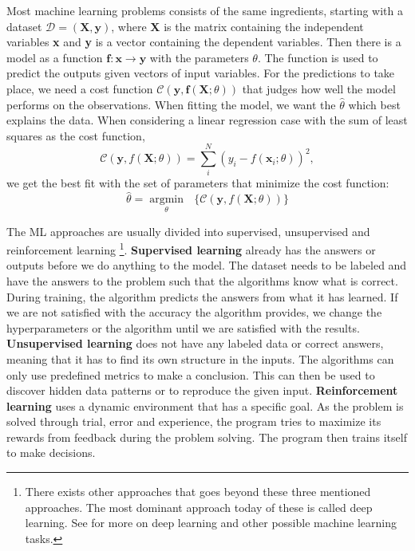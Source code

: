 \documentclass[a4paper, american, 12pt]{report}
\DeclareMathOperator*{\argmin}{argmin}
\begin{document}
	Most machine learning problems consists of the same ingredients, starting with a dataset $\mathcal{D}=(\textbf{X}, \textbf{y})$, where \textbf{X} is the matrix containing the independent variables \textbf{x} and \textbf{y} is a vector containing the dependent variables. Then there is a model as a function $\textbf{f}:\textbf{x}\rightarrow\textbf{y}$ with the parameters $\theta$. The function is used to predict the outputs given vectors of input variables. For the predictions to take place, we need a cost function $\mathcal{C}(\textbf{y},\textbf{f}(\textbf{X};\theta))$ that judges how well the model performs on the observations. When fitting the model, we want the $\hat{\theta}$ which best explains the data. When considering a linear regression case with the sum of least squares as the cost function,
	\begin{equation}
	\label{eq:SumLeastSquares}
		\mathcal{C}(\textbf{y},f(\textbf{X};\theta))=\sum_{i}^{N}(y_i-f(\textbf{x}_i;\theta))^2,
	\end{equation}
	we get the best fit with the set of parameters that minimize the cost function:
	\begin{equation}
	\label{eq:MinCostFunc}
		\hat{\theta}=\underset{\theta}{\argmin}\text{ } \{\mathcal{C}(\textbf{y},f(\textbf{X};\theta))\}
	\end{equation}
	
	The ML approaches are usually divided into supervised, unsupervised and reinforcement learning \footnote{There exists other approaches that goes beyond these three mentioned approaches. The most dominant approach today of these is called deep learning. See \citet{Goodfellow-et-al-2016} for more on deep learning and other possible machine learning tasks.}. \textbf{Supervised learning} already has the answers or outputs before we do anything to the model. The dataset needs to be labeled and have the answers to the problem such that the algorithms know what is correct. During training, the algorithm predicts the answers from what it has learned. If we are not satisfied with the accuracy the algorithm provides, we change the hyperparameters or the algorithm until we are satisfied with the results. \textbf{Unsupervised learning} does not have any labeled data or correct answers, meaning that it has to find its own structure in the inputs. The algorithms can only use predefined metrics to make a conclusion. This can then be used to discover hidden data patterns or to reproduce the given input. \textbf{Reinforcement learning} uses a dynamic environment that has a specific goal. As the problem is solved through trial, error and experience, the program tries to maximize its rewards from feedback during the problem solving. The program then trains itself to make decisions.
	
\end{document}
